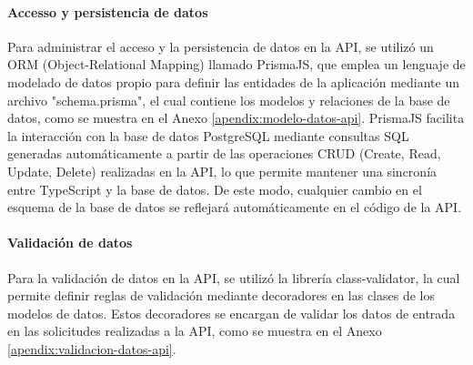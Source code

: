 \paragraph{Accesso y persistencia de datos}
Para administrar el acceso y la persistencia de datos en la API, se utilizó un ORM (Object-Relational Mapping) llamado PrismaJS, que
emplea un lenguaje de modelado de datos propio para definir las entidades de la aplicación mediante un archivo "schema.prisma", el cual
contiene los modelos y relaciones de la base de datos, como se muestra en el Anexo \ref{apendix:modelo-datos-api}. PrismaJS facilita
la interacción con la base de datos PostgreSQL mediante consultas SQL generadas automáticamente a partir de las operaciones CRUD (Create,
Read, Update, Delete) realizadas en la API, lo que permite mantener una sincronía entre TypeScript y la base de datos. De este modo,
cualquier cambio en el esquema de la base de datos se reflejará automáticamente en el código de la API.



\paragraph{Validación de datos}
Para la validación de datos en la API, se utilizó la librería class-validator, la cual permite definir reglas de validación mediante
decoradores en las clases de los modelos de datos. Estos decoradores se encargan de validar los datos de entrada en las solicitudes
realizadas a la API, como se muestra en el Anexo \ref{apendix:validacion-datos-api}.

